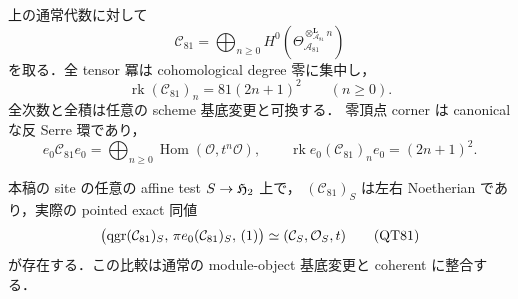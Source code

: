 \begin{theorem}
\label{thm:qa-universal-h2-rank81-completion}
上の通常代数に対して
\[
 \mathcal C_{81}
 =\bigoplus_{n\ge0}
 H^0\left(\Theta_{\mathcal A_{81}}^{
                   \otimes_{\mathcal A_{81}}^{\mathbf L}n}\right)
\]
を取る．全 tensor 冪は cohomological degree 零に集中し，
\[
 \operatorname{rk}(\mathcal C_{81})_n=81(2n+1)^2
 \qquad(n\ge0).
\]
全次数と全積は任意の scheme 基底変更と可換する．
零頂点 corner は canonical な反 Serre 環であり，
\[
 e_0\mathcal C_{81}e_0
   =\bigoplus_{n\ge0}\operatorname{Hom}(\mathcal O,t^n\mathcal O),
 \qquad
 \operatorname{rk}e_0(\mathcal C_{81})_ne_0=(2n+1)^2.
\]

本稿の site の任意の affine test $S\to\mathfrak H_2$ 上で，
$(\mathcal C_{81})_S$ は左右 Noetherian であり，実際の pointed exact 同値
\[
 \bigl(\operatorname{qgr}(\mathcal C_{81})_S,\,
       \pi e_0(\mathcal C_{81})_S,\,(1)\bigr)
   \simeq (\mathcal C_S,\mathcal O_S,t)
 \tag{QT81}\label{eq:qa-h2-rank81-pointed-tails}
\]
が存在する．この比較は通常の module-object 基底変更と coherent に整合する．
\end{theorem}
